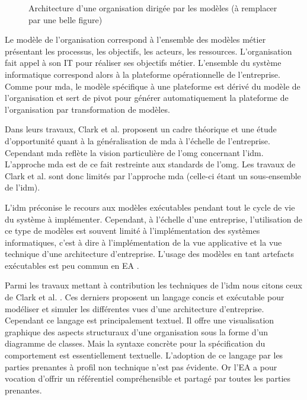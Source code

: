 \begin{figure}[!ht]
    \begin{center}
        
    \end{center}
    \caption{Architecture d'une organisation dirigée par les modèles (à remplacer par une belle figure) \protect\cite{clark_towards_2014}}
    \label{fig:mdo}
\end{figure}

Le modèle de l'organisation correspond à l'ensemble des modèles métier présentant les processus, les objectifs, les acteurs, les ressources. L'organisation fait appel à son IT pour réaliser ses objectifs métier. L'ensemble du système informatique correspond alors à la plateforme opérationnelle de l'entreprise. Comme pour \gls{mda}, le modèle spécifique à une plateforme est dérivé du modèle de l'organisation et sert de pivot pour générer automatiquement la plateforme de l'organisation par transformation de modèles.

Dans leurs travaux, Clark et al. \cite{clark_towards_2014} proposent un cadre théorique et une étude d'opportunité quant à la généralisation de \gls{mda} à l'échelle de l'entreprise. Cependant \gls{mda} reflète la vision particulière de l'\gls{omg} concernant l'\gls{idm}. L'approche \gls{mda} est de ce fait restreinte aux standards de l'\gls{omg}. Les travaux de Clark et al. sont donc limités par l'approche \gls{mda} (celle-ci étant un sous-ensemble de l'\gls{idm}).

L'\gls{idm} préconise le recours aux modèles exécutables pendant tout le cycle de vie du système à implémenter. Cependant, à l'échelle d'une entreprise, l'utilisation de ce type de modèles est souvent limité à l'implémentation des systèmes informatiques, c'est à dire à l'implémentation de la vue applicative et la vue technique d'une architecture d'entreprise. L'usage des modèles en tant artefacts exécutables est peu commun en EA \cite{kulkarni_modelling_2013}.

Parmi les travaux mettant à contribution les techniques de l'\gls{idm} nous citons ceux de Clark et al. \cite{clark2011leap}. Ces derniers proposent un langage concis et exécutable pour modéliser et simuler les différentes vues d'une architecture d'entreprise. Cependant ce langage est principalement textuel. Il offre une visualisation graphique des aspects structuraux d'une organisation sous la forme d'un diagramme de classes. Mais la syntaxe concrète pour la spécification du comportement est essentiellement textuelle. L'adoption de ce langage par les parties prenantes à profil non technique n'est pas évidente. Or l'EA a pour vocation d'offrir un référentiel compréhensible et partagé par toutes les parties prenantes.

